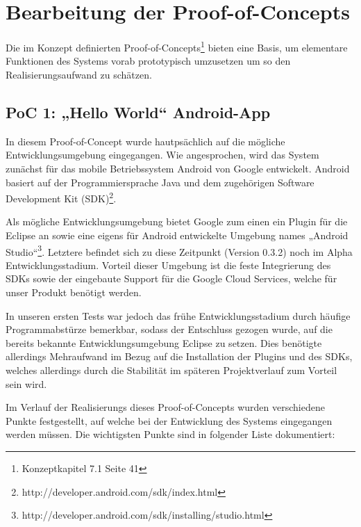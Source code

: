 
\section{Bearbeitung der Proof-of-Concepts}

Die im Konzept definierten Proof-of-Concepts\footnote{Konzeptkapitel 7.1 Seite 41} bieten eine Basis, um elementare Funktionen des Systems vorab prototypisch umzusetzen um so den Realisierungsaufwand zu schätzen.

\subsection{PoC 1: „Hello World“ Android-App}

In diesem Proof-of-Concept wurde hautpsächlich auf die mögliche Entwicklungsumgebung eingegangen. Wie angesprochen, wird das System zunächst für das mobile Betriebssystem Android von Google entwickelt. Android basiert auf der Programmiersprache Java und dem zugehörigen Software Development Kit (SDK)\footnote{http://developer.android.com/sdk/index.html}.

Als mögliche Entwicklungsumgebung bietet Google zum einen ein Plugin für die Eclipse an sowie eine eigens für Android entwickelte Umgebung names „Android Studio“\footnote{http://developer.android.com/sdk/installing/studio.html}. Letztere befindet sich zu diese Zeitpunkt (Version 0.3.2) noch im Alpha Entwicklungsstadium. Vorteil dieser Umgebung ist die feste Integrierung des SDKs sowie der eingebaute Support für die Google Cloud Services, welche für unser Produkt benötigt werden.

In unseren ersten Tests war jedoch das frühe Entwicklungsstadium durch häufige Programmabstürze bemerkbar, sodass der Entschluss gezogen wurde, auf die bereits bekannte Entwicklungsumgebung Eclipse zu setzen. Dies benötigte allerdings Mehraufwand im Bezug auf die Installation der Plugins und des SDKs, welches allerdings durch die Stabilität im späteren Projektverlauf zum Vorteil sein wird.

Im Verlauf der Realisierungs dieses Proof-of-Concepts wurden verschiedene Punkte festgestellt, auf welche bei der Entwicklung des Systems eingegangen werden müssen. Die wichtigsten Punkte sind in folgender Liste dokumentiert:


